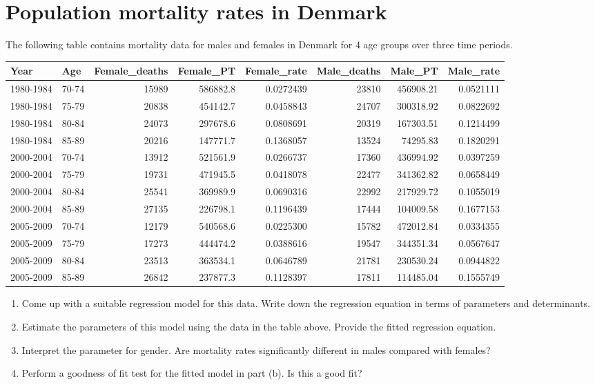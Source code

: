 \documentclass[letterpaper,9pt,twoside,printwatermark=false]{pinp}
\providecommand{\tightlist}{%
  \setlength{\itemsep}{0pt}\setlength{\parskip}{0pt}}
\begin{document}
\section{Population mortality rates in
Denmark}\label{population-mortality-rates-in-denmark}

The following table contains mortality data for males and females in
Denmark for 4 age groups over three time periods.

\vspace*{0.3in}

\begin{tabular}{l|l|r|r|r|r|r|r}
\hline
Year & Age & Female\_deaths & Female\_PT & Female\_rate & Male\_deaths & Male\_PT & Male\_rate\\
\hline
1980-1984 & 70-74 & 15989 & 586882.8 & 0.0272439 & 23810 & 456908.21 & 0.0521111\\
\hline
1980-1984 & 75-79 & 20838 & 454142.7 & 0.0458843 & 24707 & 300318.92 & 0.0822692\\
\hline
1980-1984 & 80-84 & 24073 & 297678.6 & 0.0808691 & 20319 & 167303.51 & 0.1214499\\
\hline
1980-1984 & 85-89 & 20216 & 147771.7 & 0.1368057 & 13524 & 74295.83 & 0.1820291\\
\hline
2000-2004 & 70-74 & 13912 & 521561.9 & 0.0266737 & 17360 & 436994.92 & 0.0397259\\
\hline
2000-2004 & 75-79 & 19731 & 471945.5 & 0.0418078 & 22477 & 341362.82 & 0.0658449\\
\hline
2000-2004 & 80-84 & 25541 & 369989.9 & 0.0690316 & 22992 & 217929.72 & 0.1055019\\
\hline
2000-2004 & 85-89 & 27135 & 226798.1 & 0.1196439 & 17444 & 104009.58 & 0.1677153\\
\hline
2005-2009 & 70-74 & 12179 & 540568.6 & 0.0225300 & 15782 & 472012.84 & 0.0334355\\
\hline
2005-2009 & 75-79 & 17273 & 444474.2 & 0.0388616 & 19547 & 344351.34 & 0.0567647\\
\hline
2005-2009 & 80-84 & 23513 & 363534.1 & 0.0646789 & 21781 & 230530.24 & 0.0944822\\
\hline
2005-2009 & 85-89 & 26842 & 237877.3 & 0.1128397 & 17811 & 114485.04 & 0.1555749\\
\hline
\end{tabular}

\begin{enumerate}
\def\labelenumi{\alph{enumi}.}
\tightlist
\item
  Come up with a suitable regression model for this data. Write down the
  regression equation in terms of parameters and determinants.
\item
  Estimate the parameters of this model using the data in the table
  above. Provide the fitted regression equation.
\item
  Interpret the parameter for gender. Are mortality rates significantly
  different in males compared with females?
\item
  Perform a goodness of fit test for the fitted model in part (b). Is
  this a good fit?
\end{enumerate}





\end{document}
